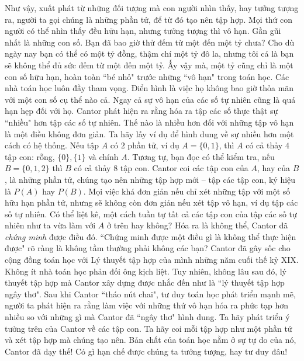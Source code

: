 \begin{multicols}{2}
\begin{figure}[H]
		\vspace*{-15pt}
	\end{figure}
	Như vậy, xuất phát từ những đối tượng mà con người nhìn thấy, hay tưởng tượng ra, người ta gọi chúng là những phần tử, để từ đó tạo nên tập hợp. Mọi thứ con người có thể nhìn thấy đều hữu hạn, nhưng tưởng tượng thì vô hạn. Gần gũi nhất là những con số. Bạn đã bao giờ thử đếm từ một đến một tỷ chưa? Cho dù ngày nay bạn có thể có một tỷ đồng, thậm chí một tỷ đô la, nhưng tôi cá là bạn sẽ không thể đủ sức đếm từ một đến một tỷ. Ấy vậy mà, một tỷ cũng chỉ là một con số hữu hạn, hoàn toàn ``bé nhỏ" trước những ``vô hạn" trong toán học.
	\vskip 0.1cm
	Các nhà toán học luôn đầy tham vọng. Điển hình là việc họ không bao giờ thỏa mãn với một con số cụ thể nào cả. Ngay cả sự vô hạn của các số tự nhiên cũng là quá hạn hẹp đối với họ. Cantor phát hiện ra rằng hóa ra tập các số thực thật sự ``nhiều" hơn tập các số tự nhiên. Thế nào là nhiều hơn đối với những tập vô hạn là một điều không đơn giản. Ta hãy lấy ví dụ để hình dung về sự nhiều hơn một cách có hệ thống.
	\vskip 0.1cm
	Nếu tập $A$ có $2$ phần tử, ví dụ $A=\{0,1\}$, thì $A$ có cả thảy $4$ tập con: rỗng, $\{0\}, \{1\}$ và chính $A$. Tương tự, bạn đọc có thể kiểm tra, nếu $B=\{0,1,2\}$ thì $B$ có cả thảy $8$ tập con. Cantor coi các tập con của $A$, hay của $B$, là những phần tử, chúng tạo nên những tập hợp mới -- tập các tập con, ký hiệu là $P(A)$ hay $P(B)$. Mọi việc khá đơn giản nếu chỉ xét những tập với một số hữu hạn phần tử, nhưng sẽ không còn đơn giản nếu xét tập vô hạn, ví dụ tập các số tự nhiên. Có thể liệt kê, một cách tuần tự tất cả các tập con của tập các số tự nhiên như ta vừa làm với $A$ ở trên hay không? 
	\vskip 0.1cm
	Hóa ra là không thể, Cantor đã \textit{chứng minh} được điều đó. ``Chứng minh được một điều gì là không thể thực hiện được" rõ ràng là không tầm thường phải không các bạn? Cantor đã gây sốc cho cộng đồng toán học với Lý thuyết tập hợp của mình những năm cuối thế kỷ XIX. Không ít nhà toán học phản đối ông kịch liệt.
	\vskip 0.1cm
	Tuy nhiên, không lâu sau đó, lý thuyết tập hợp mà Cantor xây dựng được nhắc đến như là ``lý thuyết tập hợp ngây thơ". Sau khi Cantor ``tháo nút chai", tư duy toán học phát triển mạnh mẽ, người ta phát hiện ra rằng làm việc với những thứ vô hạn hóa ra phức tạp hơn nhiều so với những gì mà Cantor đã ``ngây thơ" hình dung. 
	\vskip 0.1cm
	Ta hãy phát triển ý tưởng trên của Cantor về các tập con. Ta hãy coi mỗi tập hợp như một phần tử và xét tập hợp mà chúng tạo nên. Bản chất của toán học nằm ở sự tự do của nó, Cantor đã dạy thế! Có gì hạn chế được chúng ta tưởng tượng, hay tư duy đâu!

\end{multicols}
